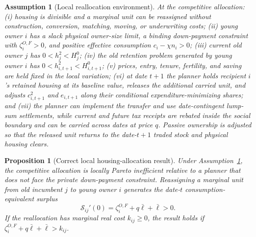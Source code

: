 \documentclass[11pt]{article}
\newtheorem{proposition}{Proposition}
\newtheorem{assumption}{Assumption}
\newcommand{\1}{\mathbf 1}
\newcommand{\ellbar}{\bar\ell}
\begin{document}
\begin{assumption}[Local reallocation environment]
\label{ass:local}
At the competitive allocation: (i) housing is divisible and a marginal unit
can be reassigned without construction, conversion, matching, moving, or
underwriting costs; (ii) young owner $i$ has a slack physical owner-size limit,
a binding down-payment constraint with $\zeta_i^{O,F}>0$, and positive
effective consumption $c_i-\chi n_i>0$; (iii) current old owner $j$ has
$0<h_j^2<H_j^0$; (iv) the old retention problem generated by young owner $i$
has $0<h_{i,t+1}^2<H_{i,t+1}^0$; (v) prices, entry, tenure, fertility, and
saving are held fixed in the local variation; (vi) at date $t+1$ the planner
holds recipient $i$'s retained housing at its baseline value, releases the
additional carried unit, and adjusts $c_{i,t+1}^2$ and $e_{i,t+1}$ along their
conditional expenditure-minimizing shares; and (vii) the planner can implement
the transfer and use date-contingent lump-sum settlements, while current and
future tax receipts are rebated inside the social boundary and can be carried
across dates at price $q$. Passive ownership is adjusted so that the released
unit returns to the date-$t+1$ traded stock and physical housing clears.
\end{assumption}

\begin{proposition}[Correct local housing-allocation result]
\label{prop:local}
Under Assumption~\ref{ass:local}, the competitive allocation is locally Pareto
inefficient relative to a planner that does not face the private down-payment
constraint. Reassigning a marginal unit from old incumbent $j$ to young owner
$i$ generates the date-$t$ consumption-equivalent surplus
\begin{equation}
\boxed{
\mathcal S_{ij}'(0)
=\zeta_i^{O,F}+q\ellbar+\ellbar>0.}
\label{eq:local_surplus}
\end{equation}
If the reallocation has marginal real cost $k_{ij}\ge0$, the result holds if
$\zeta_i^{O,F}+q\ellbar+\ellbar>k_{ij}$.
\end{proposition}
\end{document}
